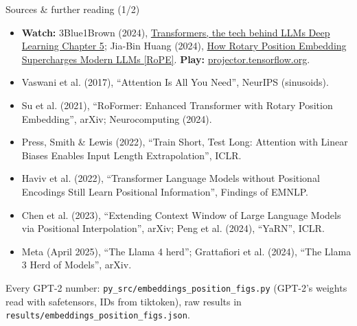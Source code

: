 \documentclass[aspectratio=169]{beamer}
\newcommand{\src}[1]{{\scriptsize\color{gray} #1}}
\newcommand{\link}[2]{\href{#1}{\textcolor{popblue}{#2}}}   %
\begin{document}
\begin{frame}{Sources \& further reading (1/2)}
  \footnotesize
  \begin{itemize}
    \item \textbf{Watch:} 3Blue1Brown (2024),
      \link{https://youtu.be/wjZofJX0v4M?t=747}{Transformers, the tech behind LLMs \textbar{} Deep
      Learning Chapter 5}; Jia-Bin Huang (2024),
      \link{https://www.youtube.com/watch?v=SMBkImDWOyQ}{How Rotary Position Embedding Supercharges
      Modern LLMs [RoPE]}. \textbf{Play:}
      \link{https://projector.tensorflow.org}{projector.tensorflow.org}.
    \item Vaswani et al. (2017), ``Attention Is All You Need'', NeurIPS (sinusoids).
    \item Su et al. (2021), ``RoFormer: Enhanced Transformer with Rotary Position Embedding'',
      arXiv; Neurocomputing (2024).
    \item Press, Smith \& Lewis (2022), ``Train Short, Test Long: Attention with Linear Biases
      Enables Input Length Extrapolation'', ICLR.
    \item Haviv et al. (2022), ``Transformer Language Models without Positional Encodings Still
      Learn Positional Information'', Findings of EMNLP.
    \item Chen et al. (2023), ``Extending Context Window of Large Language Models via Positional
      Interpolation'', arXiv; Peng et al. (2024), ``YaRN'', ICLR.
    \item Meta (April 2025), ``The Llama 4 herd''; Grattafiori et al. (2024), ``The Llama 3 Herd of
      Models'', arXiv.
  \end{itemize}
  \vskip 2pt
  \src{Every GPT-2 number: \texttt{py\_src/embeddings\_position\_figs.py} (GPT-2's weights read
  with safetensors, IDs from tiktoken), raw results in
  \texttt{results/embeddings\_position\_figs.json}.}
\end{frame}
\end{document}
